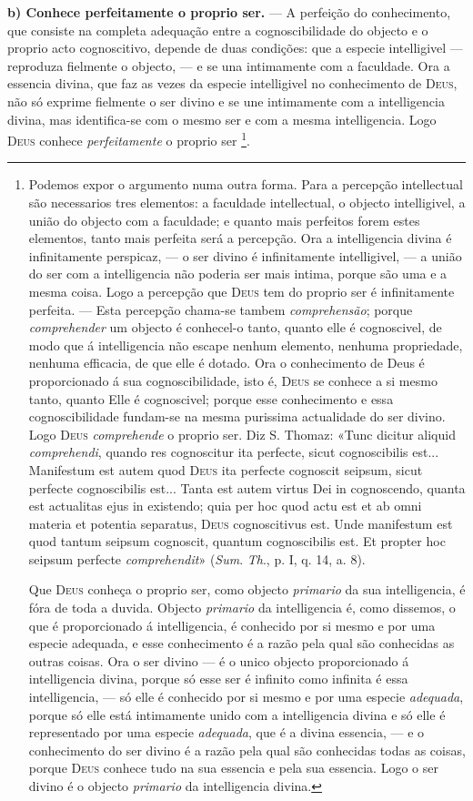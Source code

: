 \textbf{b) Conhece perfeitamente o proprio ser.} --- A perfeição do conhecimento, que consiste na completa adequação entre a cognoscibilidade do objecto e o proprio acto cognoscitivo, depende de duas condições: que a especie intelligivel --- reproduza fielmente o objecto, --- e se una intimamente com a faculdade. Ora a essencia divina, que faz as vezes da especie intelligivel no conhecimento de \textsc{Deus}, não só exprime fielmente o ser divino e se une intimamente com a intelligencia divina, mas identifica-se com o mesmo ser e com a mesma intelligencia. Logo \textsc{Deus} conhece \emph{perfeitamente} o proprio ser \footnote{Podemos expor o argumento numa outra forma. Para a percepção intellectual são necessarios tres elementos: a faculdade intellectual, o objecto intelligivel, a união do objecto com a faculdade; e quanto mais perfeitos forem estes elementos, tanto mais perfeita será a percepção. Ora a intelligencia divina é infinitamente perspicaz, --- o ser divino é infinitamente intelligivel, --- a união do ser com a intelligencia não poderia ser mais intima, porque são uma e a mesma coisa. Logo a percepção que \textsc{Deus} tem do proprio ser é infinitamente perfeita. --- Esta percepção chama-se tambem \emph{comprehensão}; porque \emph{comprehender} um objecto é conhecel-o tanto, quanto elle é cognoscivel, de modo que á intelligencia não escape nenhum elemento, nenhuma propriedade, nenhuma efficacia, de que elle é dotado. Ora o conhecimento de Deus é proporcionado á sua cognoscibilidade, isto é, \textsc{Deus} se conhece a si mesmo tanto, quanto Elle é cognoscivel; porque esse conhecimento e essa cognoscibilidade fundam-se na mesma purissima actualidade do ser divino. Logo \textsc{Deus} \emph{comprehende} o proprio ser. Diz S. Thomaz: «Tunc dicitur aliquid \emph{comprehendi}, quando res cognoscitur ita perfecte, sicut cognoscibilis est... Manifestum est autem quod \textsc{Deus} ita perfecte cognoscit seipsum, sicut perfecte cognoscibilis est... Tanta est autem virtus Dei in cognoscendo, quanta est actualitas ejus in existendo; quia per hoc quod actu est et ab omni materia et potentia separatus, \textsc{Deus} cognoscitivus est. Unde manifestum est quod tantum seipsum cognoscit, quantum cognoscibilis est. Et propter hoc seipsum perfecte \emph{comprehendit}» (\emph{Sum}. \emph{Th}., p. I, q. 14, a. 8).\par Que \textsc{Deus} conheça o proprio ser, como objecto \emph{primario} da sua intelligencia, é fóra de toda a duvida. Objecto \emph{primario} da intelligencia é, como dissemos, o que é proporcionado á intelligencia, é conhecido por si mesmo e por uma especie adequada, e esse conhecimento é a razão pela qual são conhecidas as outras coisas. Ora o ser divino --- é o unico objecto proporcionado á intelligencia divina, porque só esse ser é infinito como infinita é essa intelligencia, --- só elle é conhecido por si mesmo e por uma especie \emph{adequada}, porque só elle está intimamente unido com a intelligencia divina e só elle é representado por uma especie \emph{adequada}, que é a divina essencia, --- e o conhecimento do ser divino é a razão pela qual são conhecidas todas as coisas, porque \textsc{Deus} conhece tudo na sua essencia e pela sua essencia. Logo o ser divino é o objecto \emph{primario} da intelligencia divina.}.

